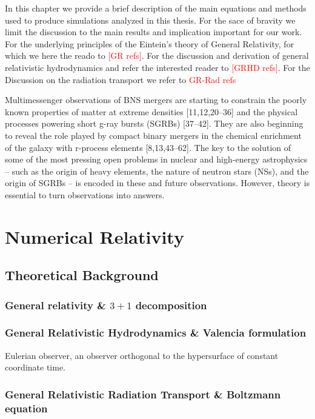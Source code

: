 \documentclass[11pt,a4paper,headinclude=true,DIV=14,BCOR=8mm,chapterprefix,listof=totoc,twoside,openright,abstracton]{scrbook}
\newcommand{\red}[1]{\textcolor{red}{#1}}
\begin{document}
In this chapter we provide a brief description of the main equations and methods used to produce simulations analyzed in this thesis. 
For the sace of bravity we limit the discussion to the main results and implication important for our work.
For the underlying principles of the Eintein's theory of General Relativity, for which we here the reado to \red{[GR refs]}.
For the discussion and derivation of general relativistic hydrodynamics and refer the interested reader to \red{[GRHD refs]}.
For the Discussion on the radiation transport we refer to \red{GR-Rad refs}

Multimessenger observations of BNS mergers are starting to constrain the poorly known properties of
matter at extreme densities [11,12,20–36] and the physical processes powering short g-ray bursts (SGRBs)
[37–42]. They are also beginning to reveal the role played by compact binary mergers in the chemical
enrichment of the galaxy with r-process elements [8,13,43–62]. The key to the solution of some of the most
pressing open problems in nuclear and high-energy astrophysics – such as the origin of heavy elements,
the nature of neutron stars (NSs), and the origin of SGRBs – is encoded in these and future observations.
However, theory is essential to turn observations into answers.

\chapter{Numerical Relativity}

\section{Theoretical Background}

\subsection{General relativity \& $3+1$ decomposition}

\subsection{General Relativistic Hydrodynamics \& Valencia formulation}

Eulerian observer, an observer orthogonal to the hypersurface of constant coordinate time.

\subsection{General Relativistic Radiation Transport \& Boltzmann equation}
\end{document}

